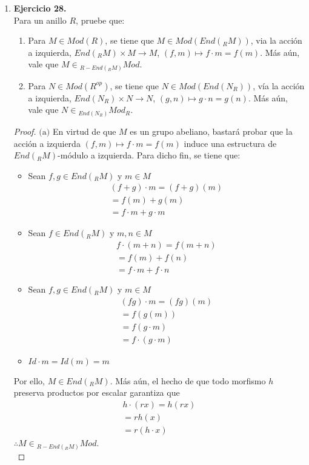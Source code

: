\documentclass{article}
\newcommand{\lrprth}[1]{
    \left(#1\right)
}
\newcommand{\opst}[1]{
    {#1}^{op}
}
\theoremstyle{definition}
\theoremstyle{plain}
\theoremstyle{plain}
\theoremstyle{definition}
\theoremstyle{definition}
\theoremstyle{definition}
\theoremstyle{definition}
\theoremstyle{definition}
\theoremstyle{definition}
\begin{document}
\begin{enumerate}[label=\textbf{Ej \arabic*.}]
	\item\textbf{Ejercicio 28.}\\
	Para un anillo $R$, pruebe que:
	\begin{enumerate}
		\item Para $M \in Mod\lrprth{R}$, se tiene que $M \in Mod\lrprth{End\lrprth{_{R}M}}$, via la acción a izquierda, $End\lrprth{_{R}M} \times M \longrightarrow M$, $\lrprth{f,m} \mapsto f \cdot m = f\lrprth{m}$. Más aún, vale que $M \in {}_{R-End\lrprth{_{R}M}}Mod$.
		\item Para $N \in Mod\lrprth{\opst{R}}$, se tiene que $N \in Mod\lrprth{End\lrprth{N_{R}}}$, vía la acción a izquierda, $End\lrprth{N_{R}} \times N \longrightarrow N$, $\lrprth{g,n} \mapsto g \cdot n = g\lrprth{n}$. Más aún, vale que $N \in {}_{End\lrprth{N_{R}}}Mod_{R}$.
	\end{enumerate}
	\begin{proof}
		$\boxed{\text{(a)}}$ En virtud de que $M$ es un grupo abeliano, bastará probar que la acción a izquierda $\lrprth{f,m} \mapsto f \cdot m = f\lrprth{m}$ induce una estructura de $End\lrprth{_{R}M}$-módulo a izquierda. Para dicho fin, se tiene que:
		\begin{itemize}
			\item Sean $f,g \in End\lrprth{_{R}M}$ y $m \in M$
			\begin{align*}
				\lrprth{f+g} \cdot m=\lrprth{f+g}\lrprth{m}\\
				=f\lrprth{m}+g\lrprth{m}\\
				=f \cdot m+g \cdot m
			\end{align*}
			\item Sean $f \in End\lrprth{_{R}M}$ y $m,n \in M$
			\begin{align*}
				f \cdot \lrprth{m+n}=f\lrprth{m+n}\\
				=f\lrprth{m}+f\lrprth{n}\\
				=f \cdot m+f \cdot n
			\end{align*}
			\item Sean $f,g \in End\lrprth{_{R}M}$ y $m \in M$
			\begin{align*}
				\lrprth{fg} \cdot m=\lrprth{fg}\lrprth{m}\\
				=f\lrprth{g\lrprth{m}}\\
				=f\lrprth{g \cdot m}\\
				=f \cdot \lrprth{g \cdot m}
			\end{align*}
			\item $Id \cdot m=Id\lrprth{m}=m$
		\end{itemize}
		Por ello, $M \in End\lrprth{_{R}M}$. Más aún, el hecho de que todo morfismo $h$ preserva productos por escalar garantiza que
		\begin{align*}
			h \cdot \lrprth{rx}=h\lrprth{rx}\\
			=rh\lrprth{x}\\
			=r\lrprth{h \cdot x}
		\end{align*}
		$\therefore M \in {}_{R-End\lrprth{_{R}M}}Mod$.\\
	

\end{proof}
\end{enumerate}
\end{document}
